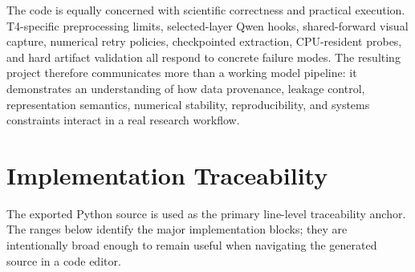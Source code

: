 \documentclass[11pt,a4paper]{article}
\begin{document}
The code is equally concerned with scientific correctness and practical execution. T4-specific preprocessing limits, selected-layer Qwen hooks, shared-forward visual capture, numerical retry policies, checkpointed extraction, CPU-resident probes, and hard artifact validation all respond to concrete failure modes. The resulting project therefore communicates more than a working model pipeline: it demonstrates an understanding of how data provenance, leakage control, representation semantics, numerical stability, reproducibility, and systems constraints interact in a real research workflow.

\section{Implementation Traceability}

The exported Python source is used as the primary line-level traceability anchor. The ranges below identify the major implementation blocks; they are intentionally broad enough to remain useful when navigating the generated source in a code editor.
\end{document}
